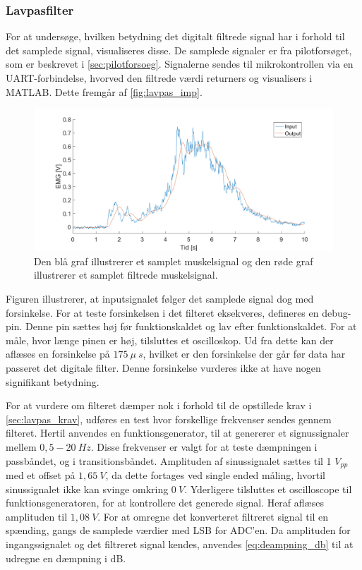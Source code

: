 \subsubsection{Lavpasfilter} \label{sec:lavpas_test}
For at undersøge, hvilken betydning det digitalt filtrede signal har i forhold til det samplede signal, visualiseres disse. De samplede signaler er fra pilotforsøget, som er beskrevet i \autoref{sec:pilotforsoeg}. Signalerne sendes til mikrokontrollen via en UART-forbindelse, hvorved den filtrede værdi returners og visualisers i MATLAB. Dette fremgår af \autoref{fig:lavpas_imp}.

\begin{figure}[H]
\centering
\includegraphics[width=1\textwidth]{figures/EMG_test}
\caption{Den blå graf illustrerer et samplet muskelsignal og den røde graf illustrerer et samplet filtrede muskelsignal.}
\label{fig:lavpas_imp}
\end{figure}

\noindent
Figuren illustrerer, at inputsignalet følger det samplede signal dog med forsinkelse. For at teste forsinkelsen i det filteret eksekveres, defineres en debug-pin. Denne pin sættes høj før funktionskaldet og lav efter funktionskaldet. For at måle, hvor længe pinen er høj, tilsluttes et oscilloskop. Ud fra dette kan der aflæses en forsinkelse på $175~\mu~s$, hvilket er den forsinkelse der går før data har passeret det digitale filter. Denne forsinkelse vurderes ikke at have nogen signifikant betydning.

For at vurdere om filteret dæmper nok i forhold til de opstillede krav i \autoref{sec:lavpas_krav}, udføres en test hvor forskellige frekvenser sendes gennem filteret. Hertil anvendes en funktionsgenerator, til at genererer et signussignaler mellem $0,5-20~Hz$. Disse frekvenser er valgt for at teste dæmpningen i passbåndet, og i transitionsbåndet.  
Amplituden af sinussignalet sættes til 1 $V_{pp}$ med et offset på $1,65~V$, da dette fortages ved single ended måling, hvortil sinussignalet ikke kan svinge omkring $0~V$. Yderligere tilsluttes et oscilloscope til funktionsgeneratoren, for at kontrollere det generede signal. Heraf aflæses amplituden til $1,08~V$.  
For at omregne det konverteret filtreret signal til en spænding, gangs de samplede værdier med LSB for ADC'en. 
Da amplituden for ingangssignalet og det filtreret signal kendes, anvendes \autoref{eq:deampning_db} til at udregne en dæmpning i dB.

